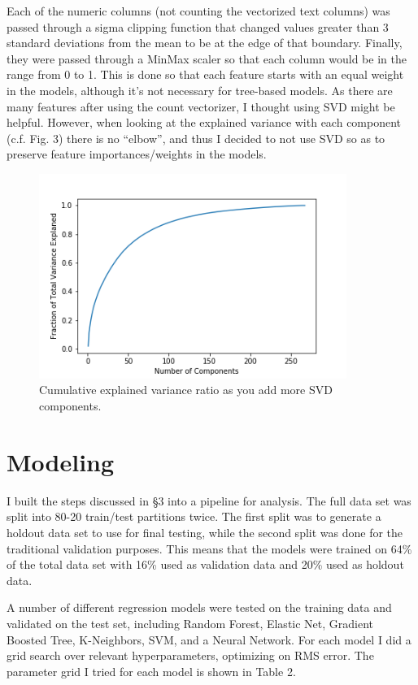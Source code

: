 \documentclass[12pt]{article}
\begin{document}
Each of the numeric columns (not counting the vectorized text columns) was passed through a sigma clipping function that changed values greater than 3 standard deviations from the mean to be at the edge of that boundary. Finally, they were passed through a MinMax scaler so that each column would be in the range from 0 to 1. This is done so that each feature starts with an equal weight in the models, although it's not necessary for tree-based models. As there are many features after using the count vectorizer, I thought using SVD might be helpful. However, when looking at the explained variance with each component (c.f. Fig. 3) there is no ``elbow'', and thus I decided to not use SVD so as to preserve feature importances/weights in the models.

\begin{figure}[ht]
\centering
\includegraphics[width=10cm]{market_svd.png}
\caption{\small Cumulative explained variance ratio as you add more SVD components.}
\end{figure}

\section{Modeling}
I built the steps discussed in \S3 into a pipeline for analysis. The full data set was split into 80-20 train/test partitions twice. The first split was to generate a holdout data set to use for final testing, while the second split was done for the traditional validation purposes. This means that the models were trained on 64\% of the total data set with 16\% used as validation data and 20\% used as holdout data.

A number of different regression models were tested on the training data and validated on the test set, including Random Forest, Elastic Net, Gradient Boosted Tree, K-Neighbors, SVM, and a Neural Network. For each model I did a grid search over relevant hyperparameters, optimizing on RMS error. The parameter grid I tried for each model is shown in Table 2.
\end{document}
